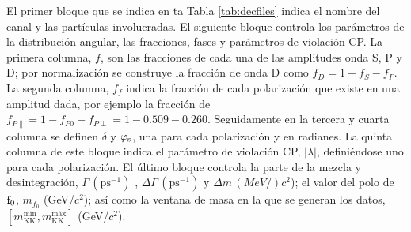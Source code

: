 \begin{table}[H]
\centering
{}
\caption{Parámetros y valores de los mismos declarados en el \texttt{DecFile}. Se puede hallar una descripción detallada en el texto.} \label{tab:decfiles}
\end{table}

El primer bloque que se indica en ta Tabla \ref{tab:decfiles} indica el nombre del canal y las partículas involucradas. El siguiente bloque controla los parámetros de la distribución angular, las fracciones, fases y parámetros de violación CP. La primera columna, $f$, son las fracciones de cada una de las amplitudes onda S, P y D; por normalización se construye la fracción de onda D como $f_{D} = 1-f_{S}-f_{P}$. La segunda columna, $f_f$ indica la fracción de cada polarización que existe en una amplitud dada, por ejemplo la fracción de $f_{P\parallel} = 1-f_{P0}-f_{P\perp} = 1-0.509-0.260$. Seguidamente en la tercera y cuarta columna se definen $\delta$ y $\varphi_{\text{s}}$, una para cada polarización y en radianes. La quinta columna de este bloque indica el parámetro de violación CP, $|\lambda|$, definiéndose uno para cada polarización. El último bloque controla la parte de la mezcla y desintegración, $\Gamma\,(\mathrm{ps^{-1}})$ , $\Delta \Gamma \,(\mathrm{ps^{-1}})$ y $\Delta m \,(MeV/)c^2$); el valor del polo de $\text{f}_0$, $m_{f_0}$ (GeV/$c^2$); así como la ventana de masa en la que se generan los datos, $[m_{\text{KK}}^{\text{mín}},m_{\text{KK}}^{\text{máx}}]$ (GeV/$c^2$).



